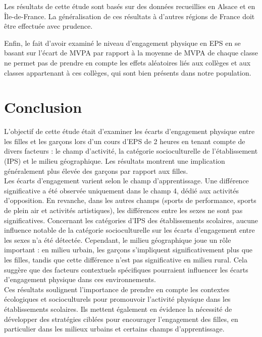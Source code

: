 \documentclass[12pt,a4paper]{article}
\renewcommand{\sectionmark}[1]{\markboth{#1}{}}
\begin{document}
Les résultats de cette étude sont basés sur des données recueillies en Alsace et en Île-de-France. La généralisation de ces résultats à d'autres régions de France doit être effectuée avec prudence.

Enfin, le fait d'avoir examiné le niveau d'engagement physique en EPS en se basant sur l'écart de MVPA par rapport à la moyenne de MVPA de chaque classe ne permet pas de prendre en compte les effets aléatoires liés aux collèges et aux classes appartenant à ces collèges, qui sont bien présents dans notre population.


\newpage
\section*{Conclusion}
\sectionmark{Conclusion}
L'objectif de cette étude était d'examiner les écarts d'engagement physique entre les filles et les garçons lors d'un cours d'EPS de 2 heures en tenant compte de divers facteurs : le champ d'activité, la catégorie socioculturelle de l'établissement (IPS) et le milieu géographique. Les résultats montrent une implication généralement plus élevée des garçons par rapport aux filles.\\
Les écarts d'engagement varient selon le champ d'apprentissage. Une différence significative a été observée uniquement dans le champ 4, dédié aux activités d'opposition. En revanche, dans les autres champs (sports de performance, sports de plein air et activités artistiques), les différences entre les sexes ne sont pas significatives. Concernant les catégories d'IPS des établissements scolaires, aucune influence notable de la catégorie socioculturelle sur les écarts d'engagement entre les sexes n'a été détectée. Cependant, le milieu géographique joue un rôle important : en milieu urbain, les garçons s'impliquent significativement plus que les filles, tandis que cette différence n'est pas significative en milieu rural. Cela suggère que des facteurs contextuels spécifiques pourraient influencer les écarts d'engagement physique dans ces environnements.\\
Ces résultats soulignent l'importance de prendre en compte les contextes écologiques et socioculturels pour promouvoir l'activité physique dans les établissements scolaires. Ils mettent également en évidence la nécessité de développer des stratégies ciblées pour encourager l'engagement des filles, en particulier dans les milieux urbains et certains champs d'apprentissage.\\
\end{document}
